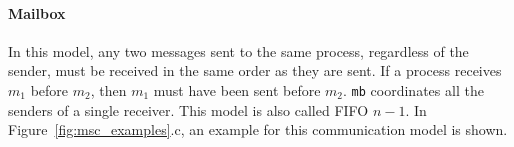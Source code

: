 

\paragraph{Mailbox}
In this model, any two messages sent to the same process, regardless of the sender, 
must be received in the same order as they are sent. If a process receives $m_1$ 
before $m_2$, then $m_1$ must have been sent before $m_2$. \verb|mb| coordinates all 
the senders of a single receiver. This model is also called FIFO $n-1$.
In Figure~\ref{fig:msc_examples}.c, an example for this communication model is shown.




